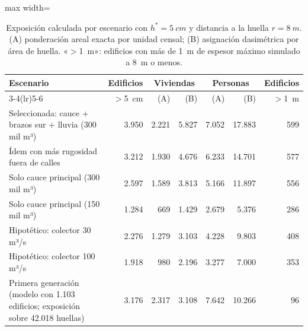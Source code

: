 \begin{table}[htbp]\centering\small
\caption{Exposición calculada por escenario con $h^*=\SI{5}{cm}$ y distancia a la huella $r=\SI{8}{m}$. (A) ponderación areal exacta por unidad censal; (B) asignación dasimétrica por área de huella. «$>$\SI{1}{m}»: edificios con más de \SI{1}{m} de espesor máximo simulado a \SI{8}{m} o menos.}\label{tab:exposicion}
\begin{adjustbox}{max width=\textwidth}\begin{tabular}{p{}rrrrrr}\toprule
Escenario & Edificios & \multicolumn{2}{c}{Viviendas} & \multicolumn{2}{c}{Personas} & Edificios\\\cmidrule(lr){3-4}\cmidrule(lr){5-6}
 & $>$\SI{5}{cm} & (A) & (B) & (A) & (B) & $>$\SI{1}{m}\\\midrule
Seleccionada: cauce + brazos sur + lluvia (300 mil m³) & 3.950 & 2.221 & 5.827 & 7.052 & 17.883 & 599\\
Ídem con más rugosidad fuera de calles & 3.212 & 1.930 & 4.676 & 6.233 & 14.701 & 577\\
Solo cauce principal (300 mil m³) & 2.597 & 1.589 & 3.813 & 5.166 & 11.897 & 556\\
Solo cauce principal (150 mil m³) & 1.284 & 669 & 1.429 & 2.679 & 5.376 & 286\\
Hipotético: colector 30 m³/s & 2.276 & 1.279 & 3.103 & 4.228 & 9.803 & 408\\
Hipotético: colector 100 m³/s & 1.918 & 980 & 2.196 & 3.277 & 7.000 & 353\\
Primera generación (modelo con 1.103 edificios; exposición sobre 42.018 huellas) & 3.176 & 2.317 & 3.108 & 7.642 & 10.266 & 96\\
\bottomrule\end{tabular}\end{adjustbox}\end{table}
